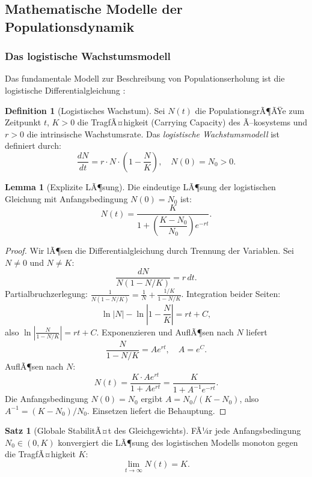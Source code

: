 ﻿\documentclass[a4paper,12pt]{article}
\theoremstyle{definition}
\newtheorem{definition}{Definition}
\newtheorem{satz}{Satz}
\newtheorem{lemma}{Lemma}
\begin{document}
\subsection{Mathematische Modelle der Populationsdynamik}

\subsubsection{Das logistische Wachstumsmodell}

Das fundamentale Modell zur Beschreibung von Populationserholung ist die logistische Differentialgleichung \cite{verhulst1838notice}:

\begin{definition}[Logistisches Wachstum]
	Sei $N(t)$ die PopulationsgrÃ¶ÃŸe zum Zeitpunkt $t$, $K > 0$ die TragfÃ¤higkeit (Carrying Capacity) des Ã–kosystems und $r > 0$ die intrinsische Wachstumsrate. Das \emph{logistische Wachstumsmodell} ist definiert durch:
	\[
	\frac{dN}{dt} = r \cdot N \cdot \left(1 - \frac{N}{K}\right), \quad N(0) = N_0 > 0.
	\]
\end{definition}

\begin{lemma}[Explizite LÃ¶sung]
	\label{lem:loesung}
	Die eindeutige LÃ¶sung der logistischen Gleichung mit Anfangsbedingung $N(0) = N_0$ ist:
	\[
	N(t) = \frac{K}{1 + \left(\dfrac{K - N_0}{N_0}\right)e^{-rt}}.
	\]
\end{lemma}

\begin{proof}
	Wir lÃ¶sen die Differentialgleichung durch Trennung der Variablen. Sei $N \neq 0$ und $N \neq K$:
	\[
	\frac{dN}{N(1 - N/K)} = r\, dt.
	\]
	Partialbruchzerlegung: $\frac{1}{N(1-N/K)} = \frac{1}{N} + \frac{1/K}{1 - N/K}$.
	Integration beider Seiten:
	\[
	\ln|N| - \ln\left|1 - \frac{N}{K}\right| = rt + C,
	\]
	also $\ln\left|\frac{N}{1 - N/K}\right| = rt + C$. 
	Exponenzieren und AuflÃ¶sen nach $N$ liefert
	\[
	\frac{N}{1-N/K} = A e^{rt}, \quad A = e^C.
	\]
	AuflÃ¶sen nach $N$:
	\[
	N(t) = \frac{K \cdot A e^{rt}}{1 + A e^{rt}} = \frac{K}{1 + A^{-1} e^{-rt}}.
	\]
	Die Anfangsbedingung $N(0) = N_0$ ergibt $A = N_0 / (K - N_0)$, also $A^{-1} = (K-N_0)/N_0$. Einsetzen liefert die Behauptung.
\end{proof}

\begin{satz}[Globale StabilitÃ¤t des Gleichgewichts]
	\label{satz:stabilitaet}
	FÃ¼r jede Anfangsbedingung $N_0 \in (0, K)$ konvergiert die LÃ¶sung des logistischen Modells monoton gegen die TragfÃ¤higkeit $K$:
	\[
	\lim_{t \to \infty} N(t) = K.
	\]
\end{satz}
\end{document}

